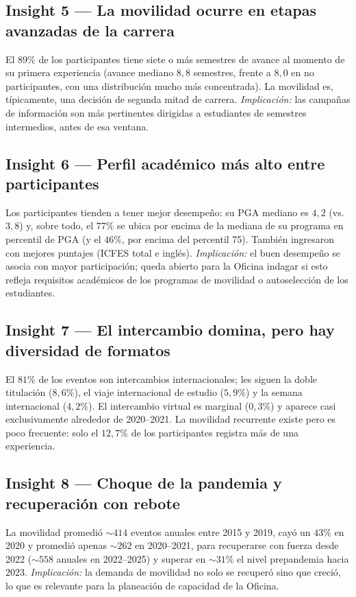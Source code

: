 \documentclass[12pt,a4paper]{article}
\begin{document}
\subsection*{Insight 5 --- La movilidad ocurre en etapas avanzadas de la carrera}
El $89\%$ de los participantes tiene siete o más semestres de avance al momento de
su primera experiencia (avance mediano $8{,}8$ semestres, frente a $8{,}0$ en no
participantes, con una distribución mucho más concentrada). La movilidad es,
típicamente, una decisión de segunda mitad de carrera. \emph{Implicación:} las
campañas de información son más pertinentes dirigidas a estudiantes de semestres
intermedios, antes de esa ventana.

\subsection*{Insight 6 --- Perfil académico más alto entre participantes}
Los participantes tienden a tener mejor desempeño: su PGA mediano es $4{,}2$ (vs.
$3{,}8$) y, sobre todo, el $77\%$ se ubica por encima de la mediana de su programa
en percentil de PGA (y el $46\%$, por encima del percentil 75). También ingresaron
con mejores puntajes (ICFES total e inglés). \emph{Implicación:} el buen
desempeño se asocia con mayor participación; queda abierto para la Oficina
indagar si esto refleja requisitos académicos de los programas de movilidad o
autoselección de los estudiantes.

\subsection*{Insight 7 --- El intercambio domina, pero hay diversidad de formatos}
El $81\%$ de los eventos son intercambios internacionales; les siguen la doble
titulación ($8{,}6\%$), el viaje internacional de estudio ($5{,}9\%$) y la semana
internacional ($4{,}2\%$). El intercambio virtual es marginal ($0{,}3\%$) y aparece
casi exclusivamente alrededor de 2020--2021. La movilidad recurrente existe pero es
poco frecuente: solo el $12{,}7\%$ de los participantes registra más de una
experiencia.

\subsection*{Insight 8 --- Choque de la pandemia y recuperación con rebote}
La movilidad promedió $\sim 414$ eventos anuales entre 2015 y 2019, cayó un
$43\%$ en 2020 y promedió apenas $\sim 262$ en 2020--2021, para recuperarse con
fuerza desde 2022 ($\sim 558$ anuales en 2022--2025) y superar en $\sim 31\%$ el
nivel prepandemia hacia 2023. \emph{Implicación:} la demanda de movilidad no solo
se recuperó sino que creció, lo que es relevante para la planeación de capacidad
de la Oficina.
\end{document}
